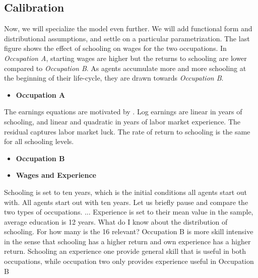 \subsection{Calibration}
Now, we will specialize the model even further. We will add functional form and distributional assumptions, and settle on a particular parametrization. The last figure shows the effect of schooling on wages for the two occupations. In \textit{Occupation A}, starting wages are higher but the returns to schooling are lower compared to \textit{Occupation B}. As agents accumulate more and more schooling at the beginning of their life-cycle, they are drawn towards \textit{Occupation B}. 
\begin{itemize}\item[] \textbf{Occupation A}\end{itemize}
The earnings equations are motivated by \citet{Mincer.1958,Mincer.1974}. Log earnings are linear in years of schooling, and linear and quadratic in years of labor market experience. The residual captures labor market luck. The rate of return to schooling is the same for all schooling levels. 
\begin{itemize}\item[] \textbf{Occupation B}\end{itemize}
\begin{itemize}\item[] \textbf{Wages and Experience}\end{itemize}
Schooling is set to ten years, which is the initial conditions all agents start out with. All agents start out with ten years. Let us briefly pause and compare the two types of occupations. ... Experience is set to their mean value in the sample, average education is 12 years. What do I know about the distribution of schooling. For how many is the 16 relevant? Occupation B is more skill intensive in the sense that schooling has a higher return and own experience has a higher return. Schooling an experience one provide general skill that is useful in both occupations, while occupation two only provides experience useful in Occupation B
